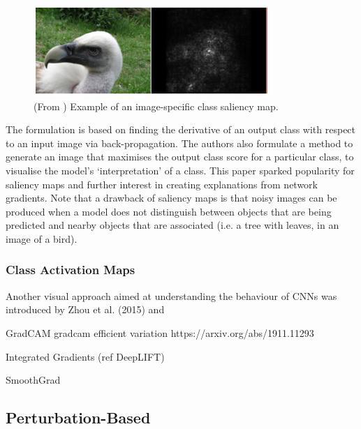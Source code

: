 \documentclass[main]{subfiles}
\begin{document}
\begin{figure}[h]
\centering
\includegraphics[scale=0.8]{saliency.png}
\caption{(From \cite{saliencyII}) Example of an image-specific class saliency map.}
\label{tsneimg}
\end{figure}

The formulation is based on finding the derivative of an output class with respect to an input image via back-propagation. The authors also formulate a method to generate an image that maximises the output class score for a particular class, to visualise the model's `interpretation' of a class. This paper sparked popularity for saliency maps and further interest in creating explanations from network gradients. Note that a drawback of saliency maps is that noisy images can be produced when a model does not distinguish between objects that are being predicted and nearby objects that are associated (i.e. a tree with leaves, in an image of a bird).

\subsubsection{Class Activation Maps}
Another visual approach aimed at understanding the behaviour of CNNs was introduced by Zhou et al. (2015) and 


GradCAM
gradcam efficient variation https://arxiv.org/abs/1911.11293





Integrated Gradients (ref DeepLIFT)

SmoothGrad


\subsection{Perturbation-Based}
\end{document}
